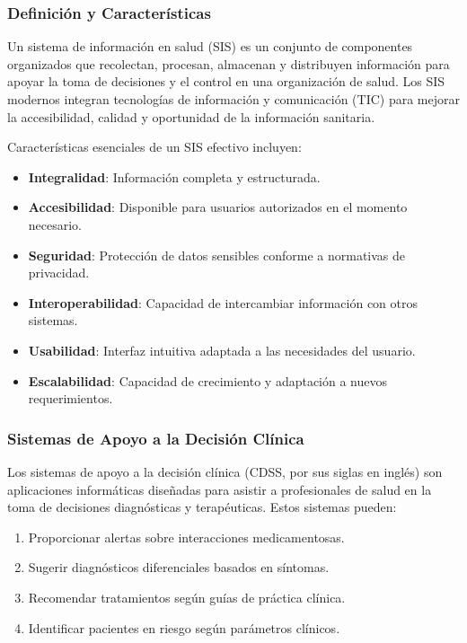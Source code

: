 \documentclass[12pt,a4paper]{article}
\begin{document}
\subsubsection{Definición y Características}

Un sistema de información en salud (SIS) es un conjunto de componentes organizados que recolectan, procesan, almacenan y distribuyen información para apoyar la toma de decisiones y el control en una organización de salud\cite{WHO2008}. Los SIS modernos integran tecnologías de información y comunicación (TIC) para mejorar la accesibilidad, calidad y oportunidad de la información sanitaria.

Características esenciales de un SIS efectivo incluyen\cite{Lippeveld2000}:

\begin{itemize}
    \item \textbf{Integralidad}: Información completa y estructurada.
    \item \textbf{Accesibilidad}: Disponible para usuarios autorizados en el momento necesario.
    \item \textbf{Seguridad}: Protección de datos sensibles conforme a normativas de privacidad.
    \item \textbf{Interoperabilidad}: Capacidad de intercambiar información con otros sistemas.
    \item \textbf{Usabilidad}: Interfaz intuitiva adaptada a las necesidades del usuario.
    \item \textbf{Escalabilidad}: Capacidad de crecimiento y adaptación a nuevos requerimientos.
\end{itemize}

\subsubsection{Sistemas de Apoyo a la Decisión Clínica}

Los sistemas de apoyo a la decisión clínica (CDSS, por sus siglas en inglés) son aplicaciones informáticas diseñadas para asistir a profesionales de salud en la toma de decisiones diagnósticas y terapéuticas\cite{Sutton2020}. Estos sistemas pueden:

\begin{enumerate}
    \item Proporcionar alertas sobre interacciones medicamentosas.
    \item Sugerir diagnósticos diferenciales basados en síntomas.
    \item Recomendar tratamientos según guías de práctica clínica.
    \item Identificar pacientes en riesgo según parámetros clínicos.
\end{enumerate}
\end{document}
